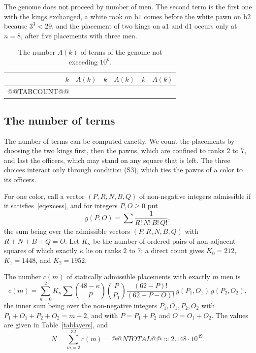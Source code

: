\documentclass[12pt,reqno]{article}
\newcommand{\sq}[1]{\mathrm{#1}}
\begin{document}
The genome does not proceed by number of men. The second term is the first one with the kings
exchanged, a white rook on $\sq{b1}$ comes before the white pawn on $\sq{b2}$ because
$3^3<29$, and the placement of two kings on $\sq{a1}$ and $\sq{d1}$ occurs only at $n=8$,
after five placements with three men.

\begin{table}[H]
\begin{center}
\begin{tabular}{r|r||r|r||r|r}
$k$ & $A(k)$ & $k$ & $A(k)$ & $k$ & $A(k)$\\ \hline
@@TABCOUNT@@
\end{tabular}
\end{center}
\caption{The number $A(k)$ of terms of the genome not exceeding $10^k$.}
\label{tabcount}
\end{table}

\subsection{The number of terms}

The number of terms can be computed exactly. We count the placements by choosing the two
kings first, then the pawns, which are confined to ranks $2$ to $7$, and last the officers, which
may stand on any square that is left. The three choices interact only through condition (S3),
which ties the pawns of a color to its officers.

For one color, call a vector $(P,R,N,B,Q)$ of non-negative integers admissible if it
satisfies~\eqref{eqexcess}, and for integers $P,O\geq 0$ put
\begin{displaymath}
g(P,O)=\sum \frac{1}{R!\,N!\,B!\,Q!},
\end{displaymath}
the sum being over the admissible vectors $(P,R,N,B,Q)$ with $R+N+B+Q=O$. Let $K_\kappa$
be the number of ordered pairs of non-adjacent squares of which exactly $\kappa$ lie on ranks
$2$ to $7$; a direct count gives $K_0=212$, $K_1=1448$, and $K_2=1952$.

\begin{theorem}\label{thmcount}
The number $c(m)$ of statically admissible placements with exactly $m$ men is
\begin{equation}\label{eqcount}
c(m)=\sum_{\kappa=0}^{2}K_\kappa\sum
\binom{48-\kappa}{P}\binom{P}{P_1}\frac{(62-P)!}{(62-P-O)!}\,g(P_1,O_1)\,g(P_2,O_2),
\end{equation}
the inner sum being over the non-negative integers $P_1,O_1,P_2,O_2$ with
$P_1+O_1+P_2+O_2=m-2$, and with $P=P_1+P_2$ and $O=O_1+O_2$. The values are given in
Table~\ref{tablayers}, and
\begin{displaymath}
N=\sum_{m=2}^{32}c(m)=@@NTOTAL@@\approx 2.148\cdot 10^{49}.
\end{displaymath}
\end{theorem}
\end{document}
